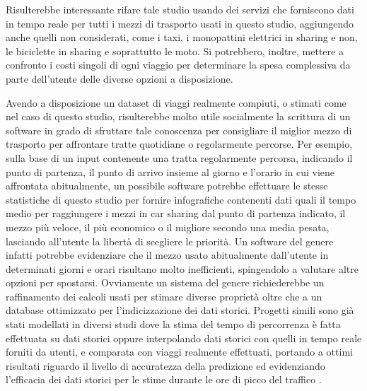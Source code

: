 Risulterebbe interessante rifare tale studio usando dei servizi che forniscono dati in tempo reale per tutti i mezzi di trasporto usati in questo studio, aggiungendo anche quelli non considerati, come i taxi, i monopattini elettrici in sharing e non, le biciclette in sharing e soprattutto le moto. Si potrebbero, inoltre, mettere a confronto i costi singoli di ogni viaggio per determinare la spesa complessiva da parte dell'utente delle diverse opzioni a disposizione.

Avendo a disposizione un dataset di viaggi realmente compiuti, o stimati come nel caso di questo studio, risulterebbe molto utile socialmente la scrittura di un software in grado di sfruttare tale conoscenza per consigliare il miglior mezzo di trasporto per affrontare tratte quotidiane o regolarmente percorse. Per esempio, sulla base di un input contenente una tratta regolarmente percorsa, indicando il punto di partenza, il punto di arrivo insieme al giorno e l'orario in cui viene affrontata abitualmente, un possibile software potrebbe effettuare le stesse statistiche di questo studio per fornire infografiche contenenti dati quali il tempo medio per raggiungere i mezzi in car sharing dal punto di partenza indicato, il mezzo più veloce, il più economico o il migliore secondo una media pesata, lasciando all'utente la libertà di scegliere le priorità. Un software del genere infatti potrebbe evidenziare che il mezzo usato abitualmente dall'utente in determinati giorni e orari risultano molto inefficienti, spingendolo a valutare altre opzioni per spostarsi. Ovviamente un sistema del genere richiederebbe un raffinamento dei calcoli usati per stimare diverse proprietà oltre che a un database ottimizzato per l'indicizzazione dei dati storici. Progetti simili sono già stati modellati in diversi studi dove la stima del tempo di percorrenza è fatta effettuata su dati storici oppure interpolando dati storici con quelli in tempo reale forniti da utenti, e comparata con viaggi realmente effettuati, portando a ottimi risultati riguardo il livello di accuratezza della predizione ed evidenziando l'efficacia dei dati storici per le stime durante le ore di picco del traffico \cite{deeshma2015travel}\cite{chien2003dynamic}.












